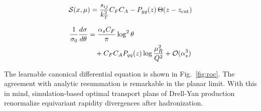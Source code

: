 \begin{equation}
  \mathcal{S}(x, \mu) = \frac{s_{ij}}{k_T^2} C_F C_A - P_{gg}(z) \, \Theta(z - z_{\rm cut})
  \label{eq:6}
\end{equation}

\begin{align}
  \frac{1}{\sigma_0} \frac{d\sigma}{d\theta} &= \frac{\alpha_s C_F}{\pi} \log^2 \theta \nonumber \\
  &\quad + C_F C_A P_{qq}(z) \log\frac{\mu_R^2}{Q^2} + \mathcal{O}(\alpha_s^3) \label{eq:7}
\end{align}

The learnable canonical differential equation is shown in
Fig.~\ref{fig:roc}. The agreement with analytic resummation is
remarkable in the planar limit. With this in mind, simulation-based
optimal transport plans of Drell-Yan production renormalize equivariant
rapidity divergences after hadronization.

